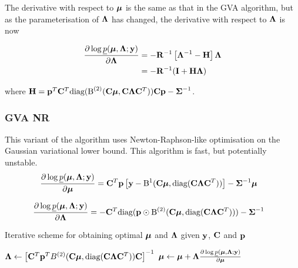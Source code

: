 \documentclass{article}[12pt]
\begin{document}
\noindent The derivative with respect to ${\boldsymbol \mu}$ is the same as that in the GVA 
algorithm, but as the parameterisation of ${\boldsymbol \Lambda}$ has changed, the  
derivative with respect to ${\boldsymbol \Lambda}$ is now

\begin{align*}
\frac{\partial \log \underline{p}({\boldsymbol \mu}, {\boldsymbol \Lambda}; {\bf y})}{\partial {\boldsymbol\Lambda}} &= -{\bf R}^{-1}\left [{\boldsymbol \Lambda}^{-1} - {\bf H} \right ]{\boldsymbol\Lambda} \\
&= -{\bf R}^{-1} ({\bf I} + {\bf H} {\boldsymbol \Lambda})
\end{align*} 

\noindent where ${\bf H} = {\bf p}^T {\bf C}^T \text{diag}({\text{B}}^{(2)}({\bf C} {\boldsymbol \mu}, {\bf C} {\boldsymbol \Lambda} {\bf C}^T)) {\bf C} {\bf p} - {\boldsymbol \Sigma}^{-1}$.


\subsubsection{GVA NR}
This variant of the algorithm uses Newton-Raphson-like optimisation on the Gaussian
variational lower bound. This algorithm is fast, but potentially unstable.
\begin{align*}
\frac{\partial \log \underline{p}({\boldsymbol \mu}, {\boldsymbol \Lambda}; {\bf y})}{\partial {\boldsymbol\mu}} &= {\bf C}^T{\bf p} \left [{\bf y} - {\text{B}}^{1}({\bf C} {\boldsymbol \mu}, \text{diag}({\bf C} {\boldsymbol \Lambda} {\bf C}^T)) \right ] - {\boldsymbol \Sigma}^{-1} {\boldsymbol \mu}
\end{align*}

\begin{align*}
\frac{\partial \log \underline{p}({\boldsymbol \mu}, {\boldsymbol \Lambda}; {\bf y})}{\partial {\boldsymbol\Lambda}} &= -{\bf C}^T \text{diag}({\bf p} \odot {\text{B}}^{(2)}({\bf C} {\boldsymbol \mu}, \text{diag}({\bf C} {\boldsymbol \Lambda} {\bf C}^T))) - {\boldsymbol \Sigma}^{-1}
\end{align*}

\begin{algorithm}\label{alg:algorithm_nr}
\label{algorithm_nr}
\caption[Algorithm GVA NR]{Iterative scheme for obtaining optimal ${\boldsymbol \mu}$ and ${\boldsymbol \Lambda}$
given ${\bf y}$, ${\bf C}$ and ${\bf p}$}
\begin{algorithmic}
\STATE ${\boldsymbol \Lambda} \leftarrow \left [ {\bf C}^T{\bf p}^T B^{(2)}({\bf C} {\boldsymbol \mu}, \text{diag}({\bf C} {\boldsymbol \Lambda} {\bf C}^T)) {\bf C} \right ]^{-1}$
\STATE ${\boldsymbol \mu} \leftarrow {\boldsymbol\mu} + {\boldsymbol \Lambda} \frac{\partial \log \underline{p}({\boldsymbol \mu}, {\boldsymbol \Lambda}; {\bf y})}{\partial {\boldsymbol\mu}}$
\ENDWHILE
\end{algorithmic}
\end{algorithm}
\end{document}
